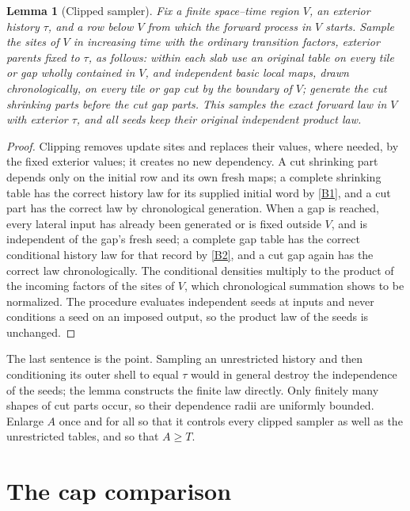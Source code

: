 \documentclass[11pt]{article}
\theoremstyle{plain}
\newtheorem{lemma}[theorem]{Lemma}
\theoremstyle{definition}
\theoremstyle{remark}
\begin{document}
\begin{lemma}[Clipped sampler]
\label{lem:clip}
Fix a finite space--time region $V$, an exterior history $\tau$, and a row below $V$ from which the forward process in $V$ starts. Sample the sites of $V$ in increasing time with the ordinary transition factors, exterior parents fixed to $\tau$, as follows: within each slab use an original table on every tile or gap wholly contained in $V$, and independent basic local maps, drawn chronologically, on every tile or gap cut by the boundary of $V$; generate the cut shrinking parts before the cut gap parts. This samples the exact forward law in $V$ with exterior $\tau$, and all seeds keep their original independent product law.
\end{lemma}

\begin{proof}
Clipping removes update sites and replaces their values, where needed, by the fixed exterior values; it creates no new dependency. A cut shrinking part depends only on the initial row and its own fresh maps; a complete shrinking table has the correct history law for its supplied initial word by \ref{B1}, and a cut part has the correct law by chronological generation. When a gap is reached, every lateral input has already been generated or is fixed outside $V$, and is independent of the gap's fresh seed; a complete gap table has the correct conditional history law for that record by \ref{B2}, and a cut gap again has the correct law chronologically. The conditional densities multiply to the product of the incoming factors of the sites of $V$, which chronological summation shows to be normalized. The procedure evaluates independent seeds at inputs and never conditions a seed on an imposed output, so the product law of the seeds is unchanged.
\end{proof}

The last sentence is the point. Sampling an unrestricted history and then conditioning its outer shell to equal $\tau$ would in general destroy the independence of the seeds; the lemma constructs the finite law directly. Only finitely many shapes of cut parts occur, so their dependence radii are uniformly bounded. Enlarge $A$ once and for all so that it controls every clipped sampler as well as the unrestricted tables, and so that $A\ge T$.

\section{The cap comparison}
\label{sec:cap}
\end{document}
